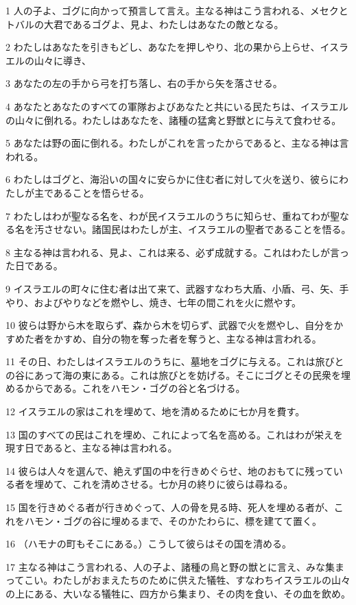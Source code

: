 \par 1 人の子よ、ゴグに向かって預言して言え。主なる神はこう言われる、メセクとトバルの大君であるゴグよ、見よ、わたしはあなたの敵となる。
\par 2 わたしはあなたを引きもどし、あなたを押しやり、北の果から上らせ、イスラエルの山々に導き、
\par 3 あなたの左の手から弓を打ち落し、右の手から矢を落させる。
\par 4 あなたとあなたのすべての軍隊およびあなたと共にいる民たちは、イスラエルの山々に倒れる。わたしはあなたを、諸種の猛禽と野獣とに与えて食わせる。
\par 5 あなたは野の面に倒れる。わたしがこれを言ったからであると、主なる神は言われる。
\par 6 わたしはゴグと、海沿いの国々に安らかに住む者に対して火を送り、彼らにわたしが主であることを悟らせる。
\par 7 わたしはわが聖なる名を、わが民イスラエルのうちに知らせ、重ねてわが聖なる名を汚させない。諸国民はわたしが主、イスラエルの聖者であることを悟る。
\par 8 主なる神は言われる、見よ、これは来る、必ず成就する。これはわたしが言った日である。
\par 9 イスラエルの町々に住む者は出て来て、武器すなわち大盾、小盾、弓、矢、手やり、およびやりなどを燃やし、焼き、七年の間これを火に燃やす。
\par 10 彼らは野から木を取らず、森から木を切らず、武器で火を燃やし、自分をかすめた者をかすめ、自分の物を奪った者を奪うと、主なる神は言われる。
\par 11 その日、わたしはイスラエルのうちに、墓地をゴグに与える。これは旅びとの谷にあって海の東にある。これは旅びとを妨げる。そこにゴグとその民衆を埋めるからである。これをハモン・ゴグの谷と名づける。
\par 12 イスラエルの家はこれを埋めて、地を清めるために七か月を費す。
\par 13 国のすべての民はこれを埋め、これによって名を高める。これはわが栄えを現す日であると、主なる神は言われる。
\par 14 彼らは人々を選んで、絶えず国の中を行きめぐらせ、地のおもてに残っている者を埋めて、これを清めさせる。七か月の終りに彼らは尋ねる。
\par 15 国を行きめぐる者が行きめぐって、人の骨を見る時、死人を埋める者が、これをハモン・ゴグの谷に埋めるまで、そのかたわらに、標を建てて置く。
\par 16 （ハモナの町もそこにある。）こうして彼らはその国を清める。
\par 17 主なる神はこう言われる、人の子よ、諸種の鳥と野の獣とに言え、みな集まってこい。わたしがおまえたちのために供えた犠牲、すなわちイスラエルの山々の上にある、大いなる犠牲に、四方から集まり、その肉を食い、その血を飲め。
